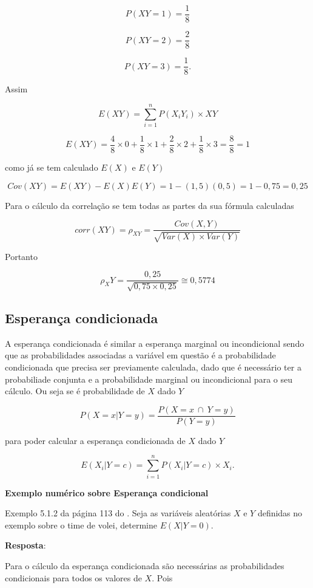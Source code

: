 \documentclass[
]{book}
\begin{document}
\[
  P(XY = 1) = \frac{1}{8}
\]

\[
  P(XY = 2) = \frac{2}{8}
\]

\[
  P(XY = 3) = \frac{1}{8}.
\]

Assim

\[
  E(XY) = \sum_{i=1}^{n} P(X_iY_i) \times XY
\]

\[
  E(XY) = \frac{4}{8} \times 0 + \frac{1}{8}\times 1 + \frac{2}{8} \times 2 + \frac{1}{8} \times 3 = \frac{8}{8} = 1
\]

como já se tem calculado \(E(X)\) e \(E(Y)\)

\[
  Cov(XY) = E(XY) - E(X)E(Y) = 1 - (1,5)(0,5) = 1 - 0,75 = 0,25
\]

Para o cálculo da correlação se tem todas as partes da sua fórmula calculadas

\[
  corr(XY) = \rho_{XY} = \dfrac{Cov(X,Y)}{\sqrt{Var(X) \times Var(Y)}} 
\]

Portanto

\[
  \rho_XY = \dfrac{0,25}{\sqrt{0,75 \times 0,25}} \cong 0,5774
\]

\hypertarget{esperanuxe7a-condicionada}{%
\subsection{Esperança condicionada}\label{esperanuxe7a-condicionada}}

A esperança condicionada é similar a esperança marginal ou incondicional sendo que as probabilidades associadas a variável em questão é a probabilidade condicionada que precisa ser previamente calculada, dado que é necessário ter a probabiliade conjunta e a probabilidade marginal ou incondicional para o seu cálculo. Ou seja se é probabilidade de \(X\) dado \(Y\)

\[
  P(X=x|Y=y) = \dfrac{P (X=x~\cap~Y=y)}{P(Y=y)}
\]

para poder calcular a esperança condicionada de \(X\) dado \(Y\)

\[
  E(X_i|Y=c) = \sum_{i=1}^{n} P(X_i| Y=c) \times X_i.
\]

\textbf{Exemplo numérico sobre Esperança condicional}

Exemplo 5.1.2 da página 113 do \citet{Sartoris2013}. Seja as variáveis aleatórias \(X\) e \(Y\) definidas no exemplo sobre o time de volei, determine \(E(X|Y=0)\).

\textbf{Resposta}:

Para o cálculo da esperança condicionada são necessárias as probabilidades condicionais para todos os valores de \(X\). Pois
\end{document}
